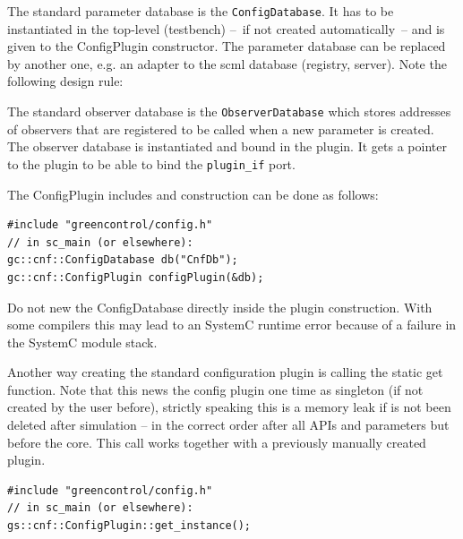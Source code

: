 
The \GreenConfig standard parameter database is the
\lstinline|ConfigDatabase|. It has to be instantiated in the top-level
(testbench) --~if not created automatically~-- and is given to the ConfigPlugin constructor. The
parameter database can be replaced by another one, e.g. an adapter to
the scml database (registry, server). Note the following design rule:


The standard observer database is the \lstinline|ObserverDatabase| which stores addresses of observers that are registered to be called when a new parameter is created. The observer database is instantiated and bound in the plugin. It gets a pointer to the plugin to be able to bind the \lstinline|plugin_if| port.

The ConfigPlugin includes and construction can be done as follows:

\noindent
\begin{minipage}{\textwidth}
\begin{lstlisting}
#include "greencontrol/config.h"
// in sc_main (or elsewhere):
gc::cnf::ConfigDatabase db("CnfDb");
gc::cnf::ConfigPlugin configPlugin(&db);
\end{lstlisting}
\end{minipage}

 Do not new the ConfigDatabase directly inside the plugin construction. With some compilers this may lead to an SystemC runtime error because of a failure in the SystemC module stack.

\noindent
\begin{minipage}{\textwidth}
Another way creating the standard configuration plugin is calling the static get function. Note that this news the config plugin one time as singleton (if not created by the user before), strictly speaking this is a memory leak if is not been deleted after simulation -- in the correct order after all APIs and parameters but before the core. This call works together with a previously manually created plugin.
\begin{lstlisting}
#include "greencontrol/config.h"
// in sc_main (or elsewhere):
gs::cnf::ConfigPlugin::get_instance();
\end{lstlisting}
\end{minipage}

